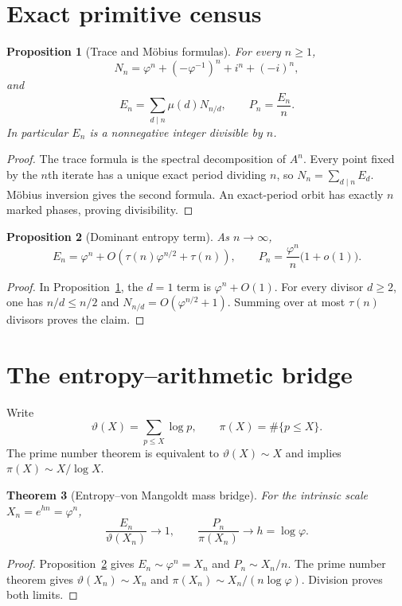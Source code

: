 \documentclass[11pt]{article}
\newtheorem{theorem}{Theorem}[section]
\newtheorem{proposition}[theorem]{Proposition}
\theoremstyle{remark}\newtheorem{remark}[theorem]{Remark}
\begin{document}
\section{Exact primitive census}
\begin{proposition}[Trace and M\"obius formulas]\label{prop:census}
For every $n\ge1$,
\[
N_n=\varphi^n+(-\varphi^{-1})^n+i^n+(-i)^n,
\]
and
\[
E_n=\sum_{d\mid n}\mu(d)N_{n/d},\qquad P_n=\frac{E_n}{n}.
\]
In particular $E_n$ is a nonnegative integer divisible by $n$.
\end{proposition}
\begin{proof}
The trace formula is the spectral decomposition of $A^n$.  Every point fixed
by the $n$th iterate has a unique exact period dividing $n$, so
$N_n=\sum_{d\mid n}E_d$.  M\"obius inversion gives the second formula.
An exact-period orbit has exactly $n$ marked phases, proving divisibility.
\end{proof}

\begin{proposition}[Dominant entropy term]\label{prop:error}
As $n\to\infty$,
\[
E_n=\varphi^n+O\!\left(\tau(n)\varphi^{n/2}+\tau(n)\right),
\qquad
P_n=\frac{\varphi^n}{n}\bigl(1+o(1)\bigr).
\]
\end{proposition}
\begin{proof}
In Proposition~\ref{prop:census}, the $d=1$ term is
$\varphi^n+O(1)$.  For every divisor $d\ge2$, one has $n/d\le n/2$ and
$N_{n/d}=O(\varphi^{n/2}+1)$.  Summing over at most $\tau(n)$ divisors
proves the claim.
\end{proof}

\section{The entropy--arithmetic bridge}
Write
\[
\vartheta(X)=\sum_{p\le X}\log p,
\qquad
\pi(X)=\#\{p\le X\}.
\]
The prime number theorem is equivalent to
$\vartheta(X)\sim X$ and implies $\pi(X)\sim X/\log X$.

\begin{theorem}[Entropy--von Mangoldt mass bridge]\label{thm:bridge}
For the intrinsic scale $X_n=e^{hn}=\varphi^n$,
\[
\boxed{\frac{E_n}{\vartheta(X_n)}\longrightarrow1},
\qquad
\boxed{\frac{P_n}{\pi(X_n)}\longrightarrow h=\log\varphi}.
\]
\end{theorem}
\begin{proof}
Proposition~\ref{prop:error} gives $E_n\sim\varphi^n=X_n$ and
$P_n\sim X_n/n$.  The prime number theorem gives
$\vartheta(X_n)\sim X_n$ and
$\pi(X_n)\sim X_n/(n\log\varphi)$.  Division proves both limits.
\end{proof}
\end{document}
